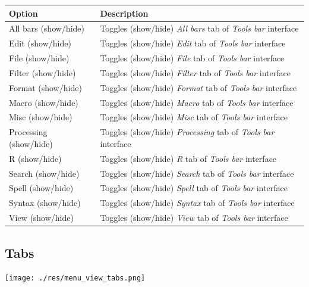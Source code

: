 \begin{scriptsize}
  \begin{tabularx}{\textwidth}{>{\hsize=0.3\hsize}X>{\hsize=0.7\hsize}X}\\
    \hline
    \textbf{Option} & \textbf{Description} \\
    \hline
    All bars (show/hide) & Toggles (show/hide) \textit{All bars} tab of \textit{Tools bar} interface \\
    Edit (show/hide) & Toggles (show/hide) \textit{Edit} tab of \textit{Tools bar} interface \\
    File (show/hide) & Toggles (show/hide) \textit{File} tab of \textit{Tools bar} interface \\
    Filter (show/hide) & Toggles (show/hide) \textit{Filter} tab of \textit{Tools bar} interface \\
    Format (show/hide) & Toggles (show/hide) \textit{Format} tab of \textit{Tools bar} interface \\
    Macro (show/hide) & Toggles (show/hide) \textit{Macro} tab of \textit{Tools bar} interface \\
    Misc (show/hide) & Toggles (show/hide) \textit{Misc} tab of \textit{Tools bar} interface \\
    Processing (show/hide) & Toggles (show/hide) \textit{Processing} tab of \textit{Tools bar} interface \\
    R (show/hide) & Toggles (show/hide) \textit{R} tab of \textit{Tools bar} interface \\
    Search (show/hide) & Toggles (show/hide) \textit{Search} tab of \textit{Tools bar} interface \\
    Spell (show/hide) & Toggles (show/hide) \textit{Spell} tab of \textit{Tools bar} interface \\
    Syntax (show/hide) & Toggles (show/hide) \textit{Syntax} tab of \textit{Tools bar} interface \\
    View (show/hide) & Toggles (show/hide) \textit{View} tab of \textit{Tools bar} interface \\
    \hline
  \end{tabularx}
\end{scriptsize}


\hypertarget{menu_view_tabs}{}
\subsection{Tabs}

\texttt{[image: ./res/menu\_view\_tabs.png]}\\


